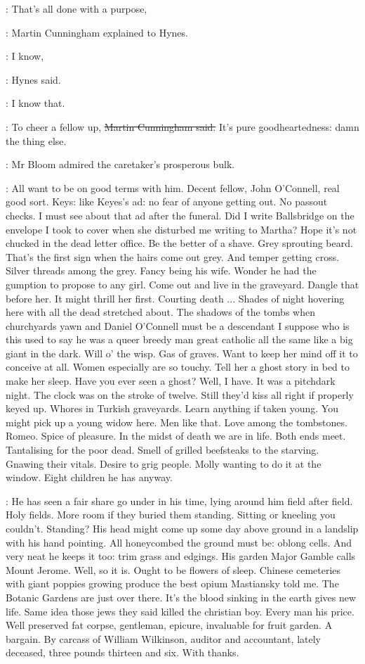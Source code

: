 \cunningham:
That's all done with a purpose,

:
Martin Cunningham explained to Hynes.

\hynes:
I know,

:
Hynes said.

\hynes:
I know that.

\cunningham:
To cheer a fellow up,
\sout{Martin Cunningham said.}
It's pure goodheartedness:
damn the thing else.

:
Mr Bloom admired the caretaker's prosperous bulk.

\BloomInt:
All want to be on good terms with him.
Decent fellow, John O'Connell, real good sort.
Keys:
like Keyes's ad:
no fear of anyone getting out.
No passout checks.
I must see about that ad after the funeral.
Did I write Ballsbridge on the envelope I took to cover
when she disturbed me writing to Martha?
Hope it's not chucked in the dead letter office.
Be the better of a shave.
Grey sprouting beard.
That's the first sign when the hairs come out grey.
And temper getting cross.
Silver threads among the grey.
Fancy being his wife.
Wonder he had the gumption to propose to any girl.
Come out and live in the graveyard.
Dangle that before her.
It might thrill her first.
Courting death ...
Shades of night hovering here with all the dead stretched about.
The shadows of the tombs when churchyards yawn
and Daniel O'Connell
must be a descendant I suppose
who is this used to say
he was a queer breedy man
great catholic all the same
like a big giant in the dark.
Will o' the wisp.
Gas of graves.
Want to keep her mind off it to conceive at all.
Women especially are so touchy.
Tell her a ghost story in bed to make her sleep.
Have you ever seen a ghost?
Well, I have.
It was a pitchdark night.
The clock was on the stroke of twelve.
Still they'd kiss all right if properly keyed up.
Whores in Turkish graveyards.
Learn anything if taken young.
You might pick up a young widow here.
Men like that.
Love among the tombstones.
Romeo.
Spice of pleasure.
In the midst of death we are in life.
Both ends meet.
Tantalising for the poor dead.
Smell of grilled beefsteaks to the starving.
Gnawing their vitals.
Desire to grig people.
Molly wanting to do it at the window.
Eight children he has anyway.

\BloomInt:
He has seen a fair share go under in his time,
lying around him field after field.
Holy fields.
More room if they buried them standing.
Sitting or kneeling you couldn't.
Standing?
His head might come up some day above ground in a landslip with his hand pointing.
All honeycombed the ground must be:
oblong cells.
And very neat he keeps it too:
trim grass and edgings.
His garden Major Gamble calls Mount Jerome.
Well, so it is.
Ought to be flowers of sleep.
Chinese cemeteries with giant poppies growing produce the best opium
Mastiansky told me.
The Botanic Gardens are just over there.
It's the blood sinking in the earth gives new life.
Same idea those jews they said killed the christian boy.
Every man his price.
Well preserved fat corpse, gentleman, epicure,
invaluable for fruit garden.
A bargain.
By carcass of William Wilkinson,
auditor and accountant, lately deceased,
three pounds thirteen and six.
With thanks.

